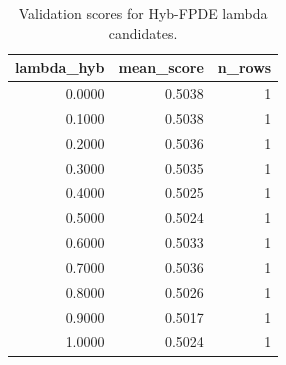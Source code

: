 \begin{table}[t]
\caption{Validation scores for Hyb-FPDE lambda candidates.}
\label{tab:lambda_distribution_computed}
\centering
\begin{tabular}{rrr}
\toprule
lambda\_hyb & mean\_score & n\_rows \\
\midrule
0.0000 & 0.5038 & 1 \\
0.1000 & 0.5038 & 1 \\
0.2000 & 0.5036 & 1 \\
0.3000 & 0.5035 & 1 \\
0.4000 & 0.5025 & 1 \\
0.5000 & 0.5024 & 1 \\
0.6000 & 0.5033 & 1 \\
0.7000 & 0.5036 & 1 \\
0.8000 & 0.5026 & 1 \\
0.9000 & 0.5017 & 1 \\
1.0000 & 0.5024 & 1 \\
\bottomrule
\end{tabular}

\end{table}
